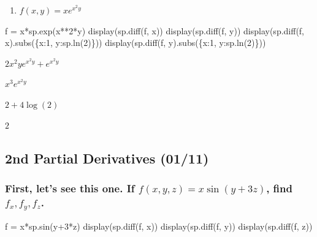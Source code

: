 \documentclass[
  letterpaper,
  DIV=11,
  numbers=noendperiod]{scrartcl}
\newenvironment{Shaded}{\begin{snugshade}}{\end{snugshade}}
\newcommand{\DecValTok}[1]{\textcolor[rgb]{0.68,0.00,0.00}{#1}}
\newcommand{\NormalTok}[1]{\textcolor[rgb]{0.00,0.23,0.31}{#1}}
\newcommand{\OperatorTok}[1]{\textcolor[rgb]{0.37,0.37,0.37}{#1}}
\providecommand{\tightlist}{%
  \setlength{\itemsep}{0pt}\setlength{\parskip}{0pt}}\usepackage{longtable,booktabs,array}
\begin{document}
\begin{enumerate}
\def\labelenumi{\arabic{enumi}.}
\tightlist
\item
  \(f(x, y) = xe^{x^2y}\)
\end{enumerate}

\begin{Shaded}
\begin{Highlighting}[numbers=left,,]
\NormalTok{f }\OperatorTok{=}\NormalTok{ x}\OperatorTok{*}\NormalTok{sp.exp(x}\OperatorTok{**}\DecValTok{2}\OperatorTok{*}\NormalTok{y)}
\NormalTok{display(sp.diff(f, x))}
\NormalTok{display(sp.diff(f, y))}
\NormalTok{display(sp.diff(f, x).subs(\{x:}\DecValTok{1}\NormalTok{, y:sp.ln(}\DecValTok{2}\NormalTok{)\}))}
\NormalTok{display(sp.diff(f, y).subs(\{x:}\DecValTok{1}\NormalTok{, y:sp.ln(}\DecValTok{2}\NormalTok{)\}))}
\end{Highlighting}
\end{Shaded}

$\displaystyle 2 x^{2} y e^{x^{2} y} + e^{x^{2} y}$

$\displaystyle x^{3} e^{x^{2} y}$

$\displaystyle 2 + 4 \log{\left(2 \right)}$

$\displaystyle 2$

\hypertarget{nd-partial-derivatives-0111}{%
\subsection{2nd Partial Derivatives
(01/11)}\label{nd-partial-derivatives-0111}}

\hypertarget{first-lets-see-this-one.-if-fx-y-z-xsiny3z-find-f_x-f_y-f_z.}{%
\subsubsection{\texorpdfstring{First, let's see this one. If
\(f(x, y, z) = x\sin(y+3z)\), find
\(f_x, f_y, f_z\).}{First, let's see this one. If f(x, y, z) = x\textbackslash sin(y+3z), find f\_x, f\_y, f\_z.}}\label{first-lets-see-this-one.-if-fx-y-z-xsiny3z-find-f_x-f_y-f_z.}}

\begin{Shaded}
\begin{Highlighting}[numbers=left,,]
\NormalTok{f }\OperatorTok{=}\NormalTok{ x}\OperatorTok{*}\NormalTok{sp.sin(y}\OperatorTok{+}\DecValTok{3}\OperatorTok{*}\NormalTok{z)}
\NormalTok{display(sp.diff(f, x))}
\NormalTok{display(sp.diff(f, y))}
\NormalTok{display(sp.diff(f, z))}
\end{Highlighting}
\end{Shaded}
\end{document}
